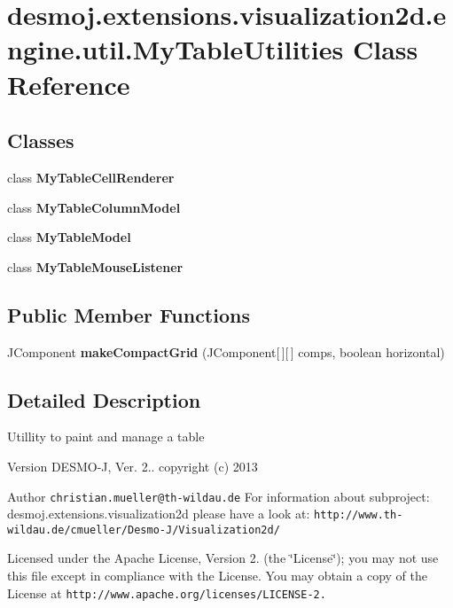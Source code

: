 \section{desmoj.\-extensions.\-visualization2d.\-engine.\-util.\-My\-Table\-Utilities Class Reference}
\label{classdesmoj_1_1extensions_1_1visualization2d_1_1engine_1_1util_1_1_my_table_utilities}
\subsection*{Classes}
\begin{DoxyCompactItemize}
\item 
class {\bfseries My\-Table\-Cell\-Renderer}
\item 
class {\bfseries My\-Table\-Column\-Model}
\item 
class {\bfseries My\-Table\-Model}
\item 
class {\bfseries My\-Table\-Mouse\-Listener}
\end{DoxyCompactItemize}
\subsection*{Public Member Functions}
\begin{DoxyCompactItemize}
\item 
J\-Component {\bfseries make\-Compact\-Grid} (J\-Component[$\,$][$\,$] comps, boolean horizontal)\label{classdesmoj_1_1extensions_1_1visualization2d_1_1engine_1_1util_1_1_my_table_utilities_a26bc7dcf1f25540e41f4e2f0b0a417c6}

\end{DoxyCompactItemize}


\subsection{Detailed Description}
Utillity to paint and manage a table

\begin{DoxyVersion}{Version}
D\-E\-S\-M\-O-\/\-J, Ver. 2.. copyright (c) 2013 
\end{DoxyVersion}
\begin{DoxyAuthor}{Author}
{\tt christian.\-mueller@th-\/wildau.\-de} For information about subproject\-: desmoj.\-extensions.\-visualization2d please have a look at\-: {\tt http\-://www.\-th-\/wildau.\-de/cmueller/\-Desmo-\/\-J/\-Visualization2d/}
\end{DoxyAuthor}
Licensed under the Apache License, Version 2. (the \char`\"{}\-License\char`\"{}); you may not use this file except in compliance with the License. You may obtain a copy of the License at {\tt http\-://www.\-apache.\-org/licenses/\-L\-I\-C\-E\-N\-S\-E-\/2.}

